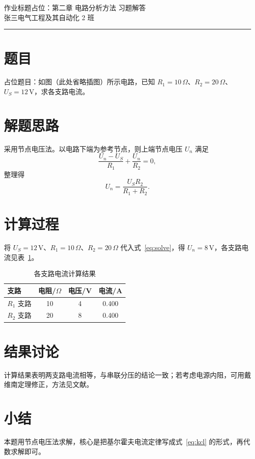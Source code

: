 \documentclass[UTF8,a4paper,zihao=-4,fontset=\swfontset]{ctexart}
\begin{document}
\begin{center}
  {\heiti 作业标题占位：第二章 电路分析方法 习题解答}\\[0.6em]
  { 张三\quad 电气工程及其自动化 2 班}
\end{center}

\vspace{0.4em}\hrule\vspace{0.8em}

\section{题目}

占位题目：如图（此处省略插图）所示电路，已知 $R_1=10\,\Omega$、$R_2=20\,\Omega$、$U_S=12\,\text{V}$，求各支路电流。

\section{解题思路}

采用节点电压法。以电路下端为参考节点，则上端节点电压 $U_n$ 满足
\begin{equation}
  \frac{U_n-U_S}{R_1}+\frac{U_n}{R_2}=0,
  \label{eq:kcl}
\end{equation}
整理得
\begin{equation}
  U_n=\frac{U_S R_2}{R_1+R_2}.
  \label{eq:solve}
\end{equation}

\section{计算过程}

将 $U_S=12\,\text{V}$、$R_1=10\,\Omega$、$R_2=20\,\Omega$ 代入式~\eqref{eq:solve}，得 $U_n=8\,\text{V}$，各支路电流见表~\ref{tab:result}。

\begin{table}[htbp]
  \centering
  \caption{各支路电流计算结果}
  \label{tab:result}
  \begin{tabular}{lccc}
    \toprule
    支路 & 电阻/$\Omega$ & 电压/V & 电流/A \\
    \midrule
    $R_1$ 支路 & 10 & 4  & 0.400 \\
    $R_2$ 支路 & 20 & 8  & 0.400 \\
    \bottomrule
  \end{tabular}
\end{table}

\section{结果讨论}

计算结果表明两支路电流相等，与串联分压的结论一致\cite{zhang2024demo}；若考虑电源内阻，可用戴维南定理修正，方法见文献\cite{smith2023demo}。

\section{小结}

本题用节点电压法求解，核心是把基尔霍夫电流定律写成式~\eqref{eq:kcl} 的形式，再代数求解即可。

\printbibliography[title={参考文献}]
\end{document}
